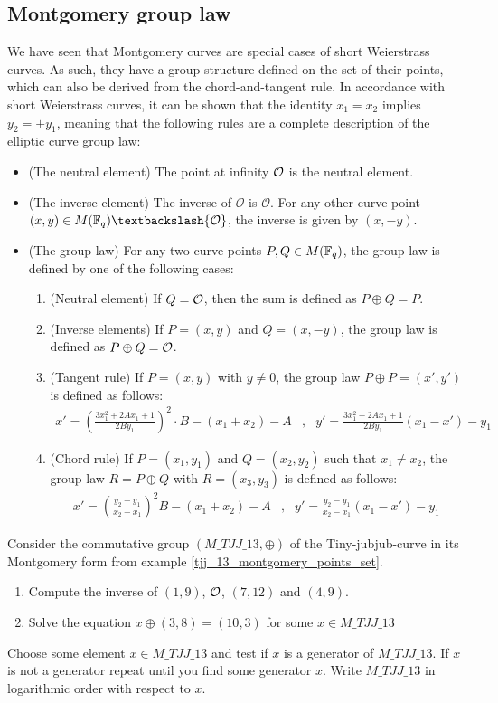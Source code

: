 \subsection{Montgomery group law} We have seen that Montgomery curves are special cases of short Weierstrass curves. As such, they have a group structure defined on the set of their points, which can also be derived from the chord-and-tangent rule. In accordance with short Weierstrass curves, it can be shown that the identity $x_1=x_2$ implies $y_2=\pm y_1$, meaning that the following rules are a complete description of the elliptic curve group law:

\begin{itemize}
\label{def:montgomery-group-law}
\item (The neutral element) The point at infinity $\mathcal{O}$ is the neutral element.
\item (The inverse element) The inverse of $\mathcal{O}$ is $\mathcal{O}$. For any other curve point $(x,y) \in M(\F_q)\textbackslash \{\mathcal{O}\}$, the inverse is given by $(x,-y)$.
\item (The group law) For any two curve points $P, Q \in M(\mathbb{F}_q)$, the group law is defined by one of the following cases:
\begin{enumerate}
\item (Neutral element) If $Q=\mathcal{O}$, then the sum is defined as $P\oplus Q=P$.
\item (Inverse elements)  If $P=(x,y)$ and $Q=(x,-y)$, the group law is defined as $P\oplus Q=\mathcal{O}$.
\item (Tangent rule) If $P=(x,y)$ with $y\neq 0$, the group law $P\oplus P=(x',y')$ is defined as follows:
$$
\begin{array}{llr}
x' = (\frac{3x_1^2 + 2A x_1 +1}{2By_1})^2\cdot B - (x_1 + x_2) - A &,&
y' = \frac{3x_1^2 + 2A x_1 +1}{2By_1}(x_1-x') - y_1
\end{array} 
$$
\item (Chord rule) If $P=(x_1,y_1)$ and $Q=(x_2,y_2)$ such that $x_1 \neq x_2$, the group law $R=P\oplus Q$ with $R=(x_3,y_3)$ is defined as follows:
$$
\begin{array}{llr}
x' = (\frac{y_2-y_1}{x_2-x_1})^2B - (x_1 + x_2) - A &, &
y' = \frac{y_2-y_1}{x_2-x_1}(x_1-x') - y_1
\end{array} 
$$
\end{enumerate}
\end{itemize}
\begin{exercise}
Consider the commutative group $(\mathit{M\_TJJ\_13},\oplus)$ of the Tiny-jubjub-curve in its Montgomery form from example \ref{tjj_13_montgomery_points_set}. 
\begin{enumerate}
\item Compute the inverse of $(1,9)$, $\mathcal{O}$, $(7,12)$ and $(4,9)$.
\item Solve the equation $x \oplus (3,8) = (10,3) $ for some $x\in \mathit{M\_TJJ\_13}$
\end{enumerate}
Choose some element $x\in \mathit{M\_TJJ\_13}$ and test if $x$ is a generator of $\mathit{M\_TJJ\_13}$. If $x$ is not a generator repeat until you find some generator $x$. Write $\mathit{M\_TJJ\_13}$ in logarithmic order with respect to $x$.
\end{exercise}
